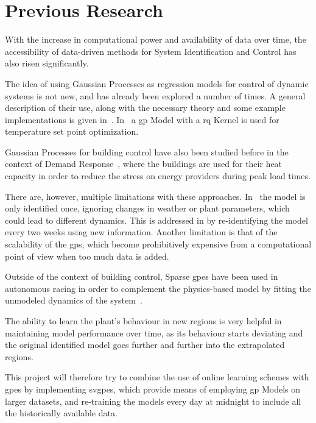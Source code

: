 \section{Previous Research}
With the increase in computational power and availability of data  over time,
the accessibility of data-driven methods for System Identification and Control
has also risen significantly. 

The idea of using Gaussian Processes as regression models for control of dynamic
systems is not new, and has already been explored a number of times. A general
description of their use, along with the necessary theory and some example
implementations is given in~\cite{kocijanModellingControlDynamic2016}.
In~\cite{pleweSupervisoryModelPredictive2020} a \acrlong{gp} Model with a
\acrlong{rq} Kernel is used for temperature set point optimization.

Gaussian Processes for building control have also been studied before in the
context of Demand Response~\cite{nghiemDatadrivenDemandResponse2017,
jainLearningControlUsing2018}, where the buildings are used for their heat
capacity in order to reduce the stress on energy providers during peak load
times.

There are, however, multiple limitations with these approaches. 
In~\cite{nghiemDatadrivenDemandResponse2017} the model is only identified once,
ignoring changes in weather or plant parameters, which could lead to different
dynamics. This is addressed in \cite{jainLearningControlUsing2018} by
re-identifying the model every two weeks using new information. Another
limitation is that of the scalability of the \acrshort{gp}s, which become
prohibitively expensive from a computational point of view when too much data is
added.

Outside of the context of building control, Sparse \acrlong{gp}es have been used
in autonomous racing in order to complement the physics-based model by fitting
the unmodeled dynamics of the
system~\cite{kabzanLearningBasedModelPredictive2019}.

The ability to learn the plant's behaviour in new regions is very helpful in
maintaining model performance over time, as its behaviour starts deviating and
the original identified model goes further and further into the extrapolated
regions.


This project will therefore try to combine the use of online learning schemes
with \acrlong{gp}es by implementing \acrlong{svgp}es, which provide means of
employing \acrshort{gp} Models on larger datasets, and re-training the models
every day at midnight to include all the historically available data.

\clearpage
